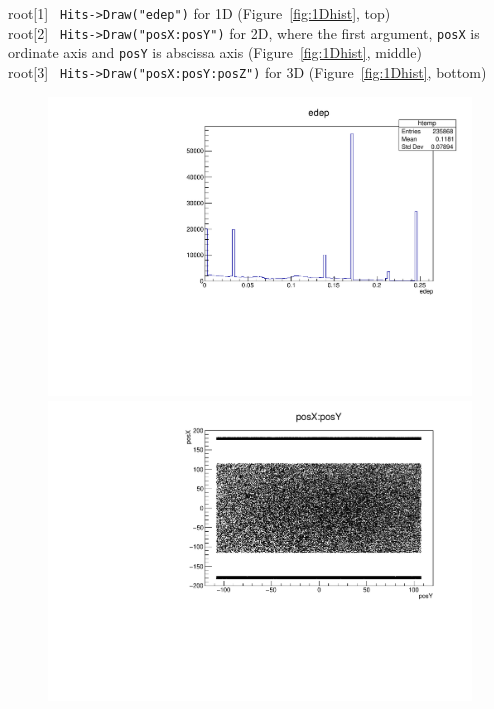 \documentclass[12pt]{article}
\begin{document}
root[1] \verb| Hits->Draw("edep")| for 1D (Figure~\ref{fig:1Dhist}, top) \\

root[2] \verb| Hits->Draw("posX:posY")| for 2D, where the first argument, \verb|posX| is ordinate axis and \verb|posY| is abscissa axis  (Figure~\ref{fig:1Dhist}, middle)\\

root[3] \verb| Hits->Draw("posX:posY:posZ")| for 3D (Figure~\ref{fig:1Dhist}, bottom)\\
\begin{figure}[h]
\centering
\includegraphics[scale=0.37]{figs/1Dhist.pdf} \\
\includegraphics[scale=0.37]{figs/2Dhist.pdf} \\

\end{figure}
\end{document}
